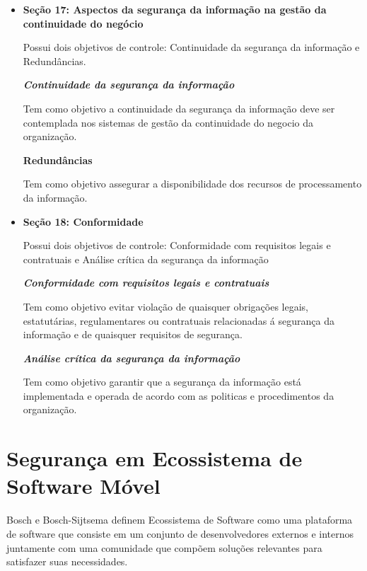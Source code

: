 \begin{itemize}
    \item \textbf{Seção 17: Aspectos da segurança da informação na gestão da continuidade do negócio}
    
    Possui dois objetivos de controle: Continuidade da segurança da informação e Redundâncias.
    
    \textit{\textbf{Continuidade da segurança da informação}}
    
    Tem como objetivo a continuidade da segurança da informação deve ser contemplada nos sistemas de gestão da continuidade do negocio da organização.
    
    \textbf{Redundâncias}
    
     Tem como objetivo assegurar a disponibilidade dos recursos de processamento da informação.
\end{itemize}
\begin{itemize}
    \item \textbf{Seção 18: Conformidade}
    
    Possui dois objetivos de controle: Conformidade com requisitos legais e contratuais e Análise crítica da segurança da informação
    
   \textit{ \textbf{Conformidade com requisitos legais e contratuais}}
    
    Tem como objetivo evitar violação de quaisquer obrigações legais, estatutárias, regulamentares ou contratuais relacionadas á segurança da informação e de quaisquer requisitos de segurança.
    
    \textit{\textbf{Análise crítica da segurança da informação}}
    
    Tem como objetivo garantir que a segurança da informação está implementada e operada de acordo com as politicas e procedimentos da organização.
\end{itemize}


\section{Segurança em Ecossistema de Software Móvel}

Bosch e Bosch-Sijtsema \cite{bosch2010integration} definem Ecossistema de Software como uma plataforma de software que consiste em um conjunto de desenvolvedores externos e internos juntamente com uma comunidade que compõem soluções  relevantes para satisfazer suas necessidades.

